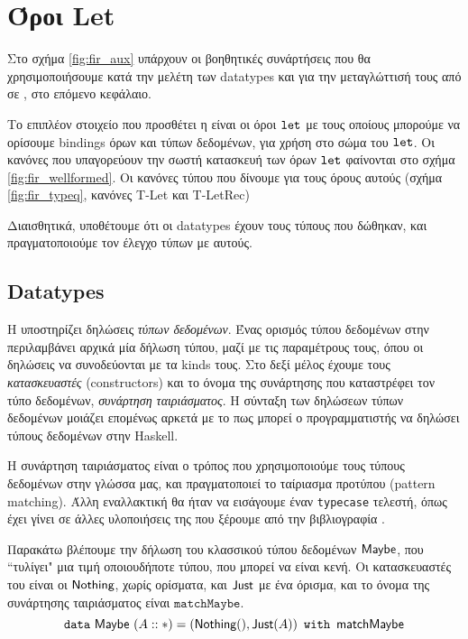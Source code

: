 \section{Όροι Let}
\label{sec:fir}


Στο σχήμα \ref{fig:fir_aux} υπάρχουν οι βοηθητικές συνάρτήσεις που θα χρησιμοποιήσουμε 
κατά την μελέτη των datatypes και για την μεταγλώττισή τους από \FIR{} σε \FOMF{}, στο επόμενο
κεφάλαιο.

Το επιπλέον στοιχείο που προσθέτει η \FIR{} είναι οι όροι $\tlet$ με τους οποίους μπορούμε
να ορίσουμε bindings όρων και τύπων δεδομένων, για χρήση στο σώμα του $\tlet$. Οι κανόνες
που υπαγορεύουν την σωστή κατασκευή των όρων $\tlet$ φαίνονται στο σχήμα \ref{fig:fir_wellformed}.
Οι κανόνες τύπου που δίνουμε για τους όρους αυτούς (σχήμα \ref{fig:fir_typeq}, κανόνες T-Let και T-LetRec)

Διαισθητικά, υποθέτουμε ότι οι datatypes έχουν τους τύπους που δώθηκαν, και πραγματοποιούμε τον έλεγχο 
τύπων με αυτούς.


\subsection{Datatypes}

Η \FIR{} υποστηρίζει δηλώσεις \emph{τύπων δεδομένων}. Ένας ορισμός τύπου δεδομένων στην \FIR{} 
περιλαμβάνει αρχικά μία δήλωση τύπου, μαζί με τις παραμέτρους τους, όπου οι δηλώσεις να συνοδεύονται με τα kinds τους. Στο δεξί μέλος έχουμε τους \emph{κατασκευαστές} (constructors) και το όνομα της 
συνάρτησης που καταστρέφει τον τύπο δεδομένων, \emph{συνάρτηση ταιριάσματος}. Η σύνταξη των 
δηλώσεων τύπων δεδομένων μοιάζει επομένως αρκετά με το πως μπορεί ο προγραμματιστής να δηλώσει
τύπους δεδομένων στην Haskell.

Η συνάρτηση ταιριάσματος είναι ο τρόπος που χρησιμοποιούμε τους τύπους δεδομένων στην γλώσσα
μας, και πραγματοποιεί το ταίριασμα προτύπου (pattern matching). Άλλη εναλλακτική θα ήταν να
εισάγουμε έναν \texttt{typecase} τελεστή, όπως έχει γίνει σε άλλες υλοποιήσεις της \FOMF{} που ξέρουμε
από την βιβλιογραφία \cite{cai}.

Παρακάτω βλέπουμε την δήλωση του κλασσικού τύπου δεδομένων $\Maybe$, που ``τυλίγει" μια τιμή
οποιουδήποτε τύπου, που μπορεί να είναι κενή. Οι κατασκευαστές του είναι οι $\Nothing$, χωρίς ορίσματα,
και  $\Just$ με ένα όρισμα, και το όνομα της συνάρτησης ταιριάσματος είναι $\texttt{matchMaybe}$.
\begin{displaymath}
\datatype{\Maybe}{(A :: \Type)}{\textsf{matchMaybe}}{(\Nothing (), \Just (A))}
\end{displaymath}


